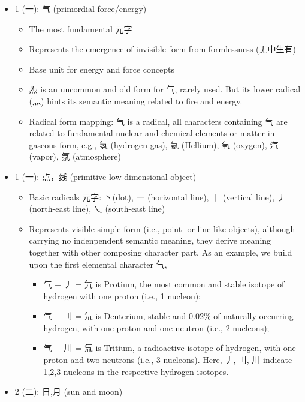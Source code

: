 \documentclass[
  11pt,
  letterpaper,
]{article}
\providecommand{\tightlist}{%
  \setlength{\itemsep}{0pt}\setlength{\parskip}{0pt}}
\begin{document}
\begin{itemize}
\tightlist
\item
  1 (一): 气 (primordial force/energy)

  \begin{itemize}
  \tightlist
  \item
    The most fundamental 元字
  \item
    Represents the emergence of invisible form from formlessness
    (无中生有)
  \item
    Base unit for energy and force concepts
  \item
    炁 is an uncommon and old form for 气, rarely used. But its lower
    radical (灬) hints its semantic meaning related to fire and energy.
  \item
    Radical form mapping: 气 is a radical, all characters containing 气
    are related to fundamental nuclear and chemical elements or matter
    in gaseous form, e.g., 氢 (hydrogen gas), 氦 (Hellium), 氧 (oxygen),
    汽 (vapor), 氛 (atmosphere)
  \end{itemize}
\item
  1 (一): 点，线 (primitive low-dimensional object)

  \begin{itemize}
  \tightlist
  \item
    Basic radicals 元字: 丶(dot), 一 (horizontal line), 丨 (vertical
    line), 丿 (north-east line), 乀 (south-east line)
  \item
    Represents visible simple form (i.e., point- or line-like objects),
    although carrying no indenpendent semantic meaning, they derive
    meaning together with other composing character part. As an example,
    we build upon the first elemental character 气,

    \begin{itemize}
    \tightlist
    \item
      气 + 丿 = 氕 is Protium, the most common and stable isotope of
      hydrogen with one proton (i.e., 1 nucleon);
    \item
      气 + 刂 = 氘 is Deuterium, stable and 0.02\% of naturally
      occurring hydrogen, with one proton and one neutron (i.e., 2
      nucleons);
    \item
      气 + 川 = 氚 is Tritium, a radioactive isotope of hydrogen, with
      one proton and two neutrons (i.e., 3 nucleons). Here, 丿, 刂, 川
      indicate 1,2,3 nucleons in the respective hydrogen isotopes.
    \end{itemize}
  \end{itemize}
\item
  2 (二): 日,月 (sun and moon)


\end{itemize}
\end{document}
